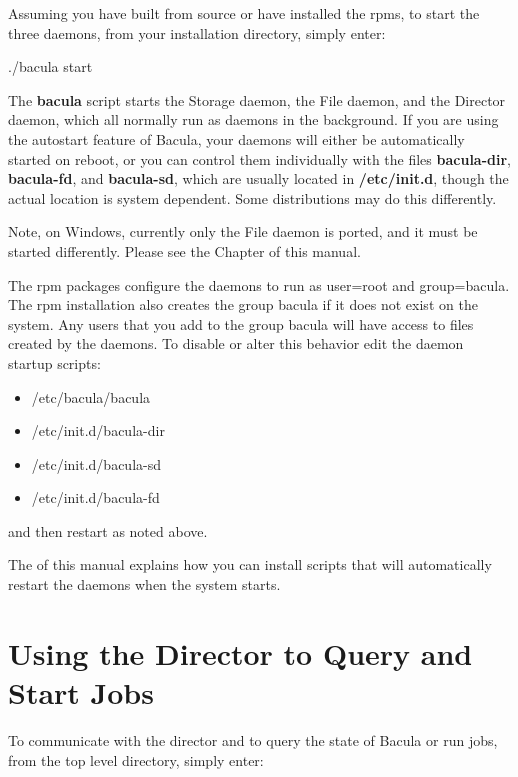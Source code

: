 Assuming you have built from source or have installed the rpms,
to start the three daemons, from your installation directory, simply enter: 

./bacula start 

The {\bf bacula} script starts the Storage daemon, the File daemon, and the
Director daemon, which all normally run as daemons in the background. If you
are using the autostart feature of Bacula, your daemons will either be
automatically started on reboot, or you can control them individually with the
files {\bf bacula-dir}, {\bf bacula-fd}, and {\bf bacula-sd}, which are
usually located in {\bf /etc/init.d}, though the actual location is system
dependent. 
Some distributions may do this differently.

Note, on Windows, currently only the File daemon is ported, and it must be
started differently. Please see the 
 Chapter of this
manual. 

The rpm packages configure the daemons to run as user=root and group=bacula.
The rpm installation also creates the group bacula if it does not exist on the
system. Any users that you add to the group bacula will have access to files
created by the daemons. To disable or alter this behavior edit the daemon
startup scripts: 

\begin{itemize}
\item /etc/bacula/bacula 
\item /etc/init.d/bacula-dir 
\item /etc/init.d/bacula-sd 
\item /etc/init.d/bacula-fd 
   \end{itemize}

and then restart as noted above. 

The 
 of this manual
explains how you can install scripts that will automatically restart the
daemons when the system starts. 

\section{Using the Director to Query and Start Jobs}

To communicate with the director and to query the state of Bacula or run jobs,
from the top level directory, simply enter: 

